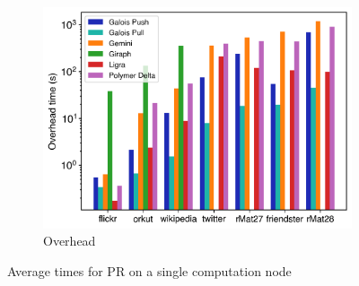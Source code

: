 \begin{figure}[ht]
\begin{subfigure}{0.32\textwidth}
		\includegraphics[width=\linewidth]{../../plots/singleNodePR_overheadTIme.png}
		\caption{Overhead}
		\label{fig:singleNodePR_overhead}
	\end{subfigure}
	\hfil
	\caption{Average times for PR on a single computation node}
	\label{fig:singleNodePR}
\end{figure}
